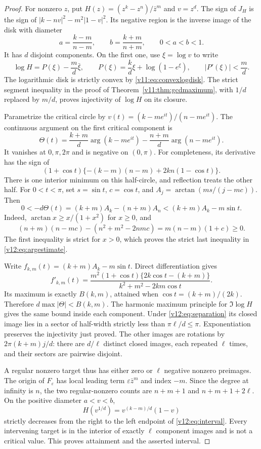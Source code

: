 \documentclass[UTF8,11pt]{ctexart}
\theoremstyle{definition}
\numberwithin{equation}{section}
\begin{document}
\begin{proof}
For nonzero $z$, put $H(z)=(z^k-z^n)/\bar z^m$ and $v=z^d$.
The sign of $J_H$ is the sign of
$|k-nv|^2-m^2|1-v|^2$. Its negative region is the inverse image
of the disk with diameter
\[
 a=\frac{k-m}{n-m},\qquad b=\frac{k+m}{n+m},\qquad 0<a<b<1.
\]
It has $d$ disjoint components. On the first one, use
$\xi=\log v$ to write
\[
 \log H=P(\xi)-\frac md\bar\xi,
 \qquad P(\xi)=\frac kd\xi+\log(1-e^\xi),\qquad
 |P'(\xi)|<\frac md.
\]
The logarithmic disk is strictly convex by
\eqref{v11:eq:convexlogdisk}. The strict segment inequality in
the proof of Theorem~\ref{v11:thm:gcdmaximum}, with $1/d$
replaced by $m/d$, proves injectivity of $\log H$ on its closure.

Parametrize the critical circle by
$v(t)=(k-me^{it})/(n-me^{it})$. The continuous argument on the
first critical component is
\[
 \Theta(t)=\frac{k+m}{d}\arg(k-me^{it})
           -\frac{n+m}{d}\arg(n-me^{it}).
\]
It vanishes at $0,\pi,2\pi$ and is negative on $(0,\pi)$.
For completeness, its derivative has the sign of
\[
 (1+\cos t)\{-(k-m)(n-m)+2kn(1-\cos t)\}.
\]
There is one interior minimum on this half-circle, and reflection
treats the other half. For $0<t<\pi$, set
$s=\sin t$, $c=\cos t$, and
$A_j=\arctan(ms/(j-mc))$. Then
\begin{equation}\label{v12:eq:argestimate}
 0<-d\Theta(t)=(k+m)A_k-(n+m)A_n
 <(k+m)A_k-m\sin t.
\end{equation}
Indeed, $\arctan x\ge x/(1+x^2)$ for $x\ge0$, and
\[
 (n+m)(n-mc)-(n^2+m^2-2nmc)=m(n-m)(1+c)\ge0.
\]
The first inequality is strict for $x>0$, which proves the
strict last inequality in \eqref{v12:eq:argestimate}.

Write $f_{k,m}(t)=(k+m)A_k-m\sin t$. Direct differentiation gives
\[
 f'_{k,m}(t)=
 \frac{m^2(1+\cos t)\{2k\cos t-(k+m)\}}
 {k^2+m^2-2km\cos t}.
\]
Its maximum is exactly $B(k,m)$, attained when
$\cos t=(k+m)/(2k)$. Therefore
$d\max|\Theta|<B(k,m)$. The harmonic maximum principle for
$\Im\log H$ gives the same bound inside each component.
Under \eqref{v12:eq:separation} its closed image lies in a sector
of half-width strictly less than $\pi\ell/d\le\pi$.
Exponentiation preserves the injectivity just proved. The other
images are rotations by $2\pi(k+m)j/d$: there are $d/\ell$
distinct closed images, each repeated $\ell$ times, and their
sectors are pairwise disjoint.

A regular nonzero target thus has either zero or $\ell$ negative
nonzero preimages. The origin of $F_\varepsilon$ has local leading
term $\varepsilon\bar z^m$ and index $-m$. Since the degree at
infinity is $n$, the two regular-nonzero counts are
$n+m+1$ and $n+m+1+2\ell$.
On the positive diameter $a<v<b$,
\[
 H(v^{1/d})=v^{(k-m)/d}(1-v)
\]
strictly decreases from the right to the left endpoint of
\eqref{v12:eq:interval}. Every intervening target is in the
interior of exactly $\ell$ component images and is not a critical
value. This proves attainment and the asserted interval.


\end{proof}
\end{document}
